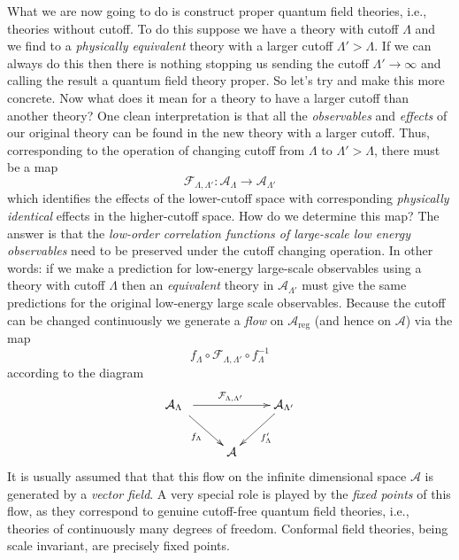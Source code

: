 \documentclass[11pt]{amsart}
\theoremstyle{plain}%
\theoremstyle{definition}
\theoremstyle{remark}
\begin{document}
What we are now going to do is construct proper quantum field theories, i.e., theories without cutoff. To do this suppose we have a theory with cutoff $\Lambda$ and we find to a \emph{physically equivalent} theory with a larger cutoff $\Lambda' > \Lambda$. If we can always do this then there is nothing stopping us sending the cutoff $\Lambda'\rightarrow \infty$ and calling the result a quantum field theory proper. So let's try and make this more concrete. Now what does it mean for a theory to have a larger cutoff than another theory? One clean interpretation is that all the \emph{observables} and \emph{effects} of our original theory can be found in the new theory with a larger cutoff. Thus, corresponding to the operation of changing cutoff from $\Lambda$ to $\Lambda' > \Lambda$, there must be a map
\begin{equation}
	\mathcal{F}_{\Lambda,\Lambda'}: \mathcal{A}_\Lambda \rightarrow \mathcal{A}_{\Lambda'}
\end{equation}
which identifies the effects of the lower-cutoff space with corresponding \emph{physically identical} effects in the higher-cutoff space. 
How do we determine this map? The answer is that the \emph{low-order correlation functions of large-scale low energy observables} need to be preserved under the cutoff changing operation. In other words: if we make a prediction for low-energy large-scale observables using a theory with cutoff $\Lambda$ then an \emph{equivalent} theory in $\mathcal{A}_{\Lambda'}$ must give the same predictions for the original low-energy large scale observables. Because the cutoff can be changed continuously we generate a \emph{flow} on $\mathcal{A}_{\text{reg}}$ (and hence on $\mathcal{A}$) via the map
\begin{equation}
	f_\Lambda\circ \mathcal{F}_{\Lambda,\Lambda'}\circ f_\Lambda^{-1}   
\end{equation}   
according to the diagram
\begin{equation}
\xymatrix{
\mathcal{A}_{\Lambda} \ar[rr]^{\mathcal{F}_{\Lambda,\Lambda'}}
\ar[dr]_{f_\Lambda}\hole
&& \mathcal{A}_{\Lambda'} \ar[dl]^{f_\Lambda'}\\
& \mathcal{A} }
\end{equation}
It is usually assumed  that that this flow on the infinite dimensional space $\mathcal{A}$ is generated by a \emph{vector field}. A very special role is played by the \emph{fixed points} of this flow, as they correspond to genuine cutoff-free quantum field theories, i.e., theories of continuously many degrees of freedom. Conformal field theories, being scale invariant, are precisely fixed points.
\end{document}
